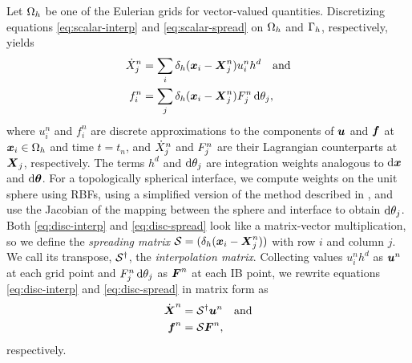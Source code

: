 Let $\Omega_h$ be one of the Eulerian grids for vector-valued quantities. Discretizing
equations \eqref{eq:scalar-interp} and \eqref{eq:scalar-spread} on $\Omega_h$ and
$\Gamma_h$, respectively, yields
\begin{align}
    \label{eq:disc-interp}
    \dot{X}^n_j &= \sum_i \delta_h(\x_i-\X^n_j)u^n_i h^d \quad \text{and} \\
    \label{eq:disc-spread}
    f^n_i &= \sum_j \delta_h(\x_i-\X^n_j)F^n_j \d\theta_j,
\end{align}
where $u^n_i$ and $f^n_i$ are discrete approximations to the components of $\boldsymbol{u}$ and $\boldsymbol{f}$
at $\boldsymbol{x}_i\in\Omega_h$ and time $t=t_n$, and $\dot{X}^n_{\smash j}$ and $F^n_{\smash j}$
are their Lagrangian counterparts at $\boldsymbol{X}_{\smash j}$, respectively. The terms $h^d$ and
$\d\theta_{\smash j}$ are integration weights analogous to $\d\x$ and $\d\params$. For
a topologically spherical interface, we compute weights on the unit sphere using RBFs,
using a simplified version of the method described in \cite{Fuselier:2013coba}, and use
the Jacobian of the mapping between the sphere and interface to obtain
$\d\theta_{\smash j}$. Both \eqref{eq:disc-interp} and \eqref{eq:disc-spread} look like a
matrix-vector multiplication, so we define the \emph{spreading matrix}
$\mathcal{S}=(\delta_h(\boldsymbol{x}_i-\boldsymbol{X}^n_{\smash j}))$ with row $i$ and column $j$. We call its
transpose, $\mathcal{S}^\dagger$, the \emph{interpolation matrix}. Collecting values $u^n_ih^d$ as
$\boldsymbol{u}^n$ at each grid point and $F^n_{\smash j}\d\theta_{\smash j}$ as $\boldsymbol{F}^n$ at each IB
point, we rewrite equations \eqref{eq:disc-interp} and \eqref{eq:disc-spread} in matrix
form as
\begin{align}
    \label{eq:matrix-interp}
    \dot{\boldsymbol{X}}^n &= \mathcal{S}^\dagger\boldsymbol{u}^n \quad\text{and} \\
    \label{eq:matrix-spread}
    \boldsymbol{f}^n &= \mathcal{S}\boldsymbol{F}^n,
\end{align}
respectively.

